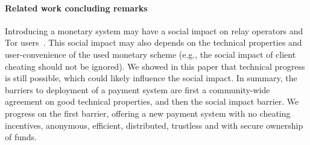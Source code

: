 \paragraph*{Related work concluding remarks}
Introducing a monetary system may have a social impact on relay operators and Tor users~\cite{jansenblogpost}. This social impact may also depends on the technical properties and user-convenience of the used monetary scheme (e.g., the social impact of client cheating should not be ignored). We showed in this paper that technical progress is still possible, which could likely influence the social impact. In summary, the barriers to deployment of a payment system are first a community-wide agreement on good technical properties, and then the social impact barrier. We progress on the first barrier, offering a new payment system with no cheating incentives, anonymous, efficient, distributed, trustless and with secure ownership of funds.




